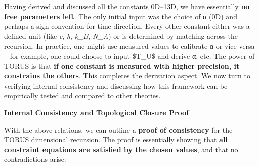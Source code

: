 \documentclass[]{article}
\begin{document}
Having derived and discussed all the constants 0D--13D, we have
essentially \textbf{no free parameters left}. The only initial input was
the choice of α (0D) and perhaps a sign convention for time direction.
Every other constant either was a defined unit (like \emph{c}, \emph{h},
\emph{k\_B}, \emph{N\_A}) or is determined by matching across the
recursion. In practice, one might use measured values to calibrate α or
vice versa -- for example, one could choose to input \$T\_U\$ and derive
α, etc. The power of TORUS is that \textbf{if one constant is measured
with higher precision, it constrains the others}. This completes the
derivation aspect. We now turn to verifying internal consistency and
discussing how this framework can be empirically tested and compared to
other theories.

\textbf{Internal Consistency and Topological Closure Proof}

With the above relations, we can outline a \textbf{proof of consistency}
for the TORUS dimensional recursion. The proof is essentially showing
that \textbf{all constraint equations are satisfied by the chosen
values}, and that no contradictions arise:
\end{document}

